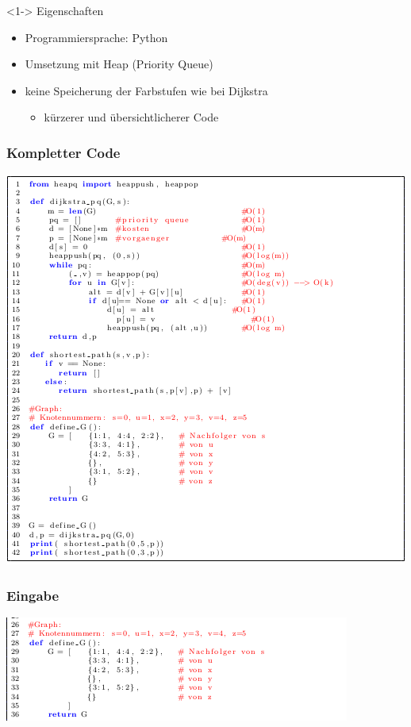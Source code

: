 \begin{frame}
	\begin{block} <1-> {Eigenschaften}
		\begin{itemize}
			\item <2-> Programmiersprache: Python
			\item <3-> Umsetzung mit Heap (Priority Queue)
			\item <4-> keine Speicherung der Farbstufen wie bei Dijkstra
				\begin{itemize}
					\item <5-> kürzerer und übersichtlicherer Code
				\end{itemize}
		\end{itemize}
	\end{block}	
\end{frame}


\begin{frame}
\frametitle{Kompletter Code}
	\centering
	\includegraphics[scale=0.4]{./pictures/Impl.png}
\end{frame}


\begin{frame}
	\frametitle{Eingabe}
	\centering
	\includegraphics[scale=0.8]{./pictures/Eingabe.png}
\end{frame}


